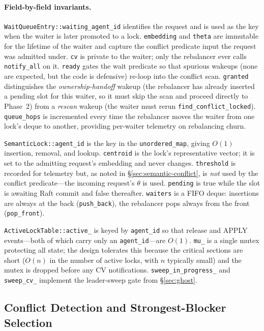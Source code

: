 \documentclass[sigconf]{acmart}
\begin{document}
\paragraph{\textbf{Field-by-field invariants.}}
\texttt{WaitQueueEntry::waiting\_agent\_id} identifies the request and
is used as the key when the waiter is later promoted to a lock.
\texttt{embedding} and \texttt{theta} are immutable for the lifetime of
the waiter and capture the conflict predicate input the request was
admitted under. \texttt{cv} is private to the waiter; only the
rebalancer ever calls \texttt{notify\_all} on it. \texttt{ready} gates
the wait predicate so that spurious wakeups (none are expected, but the
code is defensive) re-loop into the conflict scan. \texttt{granted}
distinguishes the \emph{ownership-handoff} wakeup (the rebalancer has
already inserted a pending slot for this waiter, so it must skip the
scan and proceed directly to Phase~2) from a \emph{rescan} wakeup (the
waiter must rerun \texttt{find\_conflict\_locked}). \texttt{queue\_hops}
is incremented every time the rebalancer moves the waiter from one
lock's deque to another, providing per-waiter telemetry on rebalancing
churn.

\texttt{SemanticLock::agent\_id} is the key in the
\texttt{unordered\_map}, giving $O(1)$ insertion, removal, and lookup.
\texttt{centroid} is the lock's representative vector; it is set to the
admitting request's embedding and never changes. \texttt{threshold} is
recorded for telemetry but, as noted in \S\ref{sec:semantic-conflict},
is \emph{not} used by the conflict predicate---the incoming request's
$\theta$ is used. \texttt{pending} is true while the slot is awaiting
Raft commit and false thereafter. \texttt{waiters} is a FIFO deque:
insertions are always at the back (\texttt{push\_back}), the rebalancer
pops always from the front (\texttt{pop\_front}).

\texttt{ActiveLockTable::active\_} is keyed by \texttt{agent\_id} so
that release and APPLY events---both of which carry only an
\texttt{agent\_id}---are $O(1)$. \texttt{mu\_} is a single mutex
protecting all state; the design tolerates this because the critical
sections are short ($O(n)$ in the number of active locks, with $n$
typically small) and the mutex is dropped before any CV notifications.
\texttt{sweep\_in\_progress\_} and \texttt{sweep\_cv\_} implement the
leader-sweep gate from \S\ref{sec:ghost}.

\subsection{Conflict Detection and Strongest-Blocker Selection}
\label{sec:conflict-detect}
\end{document}
